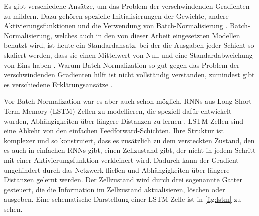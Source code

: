 Es gibt verschiedene Ansätze, um das Problem der verschwindenden Gradienten zu mildern.
Dazu gehören spezielle Initialisierungen der Gewichte, andere Aktivierungsfunktionen und die Verwendung von Batch-Normalisierung \cite{vanishing_gradients}.
Batch-Normalisierung, welches auch in den von dieser Arbeit eingesetzten Modellen benutzt wird, ist heute ein Standardansatz, bei der die Ausgaben jeder Schicht so skaliert werden, dass sie einen Mittelwert von Null und eine Standardabweichung von Eins haben \cite{batch_normalization}.
Warum Batch-Normalization so gut gegen das Problem der verschwindenden Gradienten hilft ist nicht vollständig verstanden, zumindest gibt es verschiedene Erklärungsansätze \cite{batch_normalization,batch_norm_reason_1,batch_norm_reason_2}.

Vor Batch-Normalization war es aber auch schon möglich, RNNs aus Long Short-Term Memory (LSTM) Zellen zu modellieren, die speziell dafür entwickelt wurden, Abhängigkeiten über längere Distanzen zu lernen \cite{lstm}.
LSTM-Zellen sind eine Abkehr von den einfachen Feedforward-Schichten.
Ihre Struktur ist komplexer und so konstruiert, dass es zusätzlich zu dem versteckten Zustand, den es auch in einfachen RNNs gibt, einen Zellzustand gibt, der nicht in jedem Schritt mit einer Aktivierungsfunktion verkleinert wird.
Dadurch kann der Gradient ungehindert durch das Netzwerk \glqq fließen\grqq{} und Abhängigkeiten über längere Distanzen gelernt werden.
Der Zellzustand wird durch drei sogenannte \glqq Gatter\grqq{} gesteuert, die die Information im Zellzustand aktualisieren, löschen oder ausgeben.
Eine schematische Darstellung einer LSTM-Zelle ist in \ref{fig:lstm} zu sehen.

